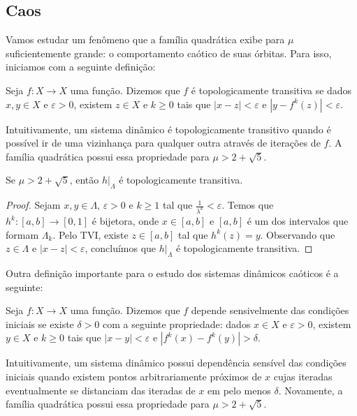 \subsection{Caos}

Vamos estudar um fenômeno que a família quadrática exibe para $\mu$ suficientemente grande: o comportamento caótico de suas órbitas.
Para isso, iniciamos com a seguinte definição:

\begin{definition}
Seja $f: X \to X$ uma função. Dizemos que $f$ é topologicamente transitiva se dados $x, y \in X$ e $\varepsilon > 0$,  existem $z \in X$ e $k \geq 0$ tais que $|x - z| < \varepsilon$ e $|y - f^k(z)| < \varepsilon$.
\end{definition} 

Intuitivamente, um sistema dinâmico é topologicamente transitivo quando é possível ir de uma vizinhança para qualquer outra através de iterações de $f$. A família quadrática possui essa propriedade para $\mu > 2 + \sqrt{5}$.

\begin{proposition}
Se $\mu > 2 + \sqrt{5}$, então $h|_\Lambda$ é topologicamente transitiva.
\end{proposition}

\begin{proof}
Sejam $x, y \in \Lambda$, $\varepsilon > 0$ e $k \geq 1$ tal que $\frac{1}{\lambda^k} < \varepsilon$.
Temos que $h^k: [a, b] \to [0, 1]$ é bijetora, onde $x \in [a, b]$ e $[a, b]$ é um dos intervalos que formam $\Lambda_k$. Pelo TVI, existe $z \in [a, b]$ tal que $h^k(z) = y$. Observando que $z \in \Lambda$ e $|x - z| < \varepsilon$, concluímos que $h|_\Lambda$ é topologicamente transitiva.
\end{proof}

Outra definição importante para o estudo dos sistemas dinâmicos caóticos é a seguinte:

\begin{definition}
Seja $f: X \to X$ uma função. Dizemos que $f$ depende sensivelmente das condições iniciais se existe $\delta > 0$ com a seguinte propriedade: dados $x \in X$ e $\varepsilon > 0$, existem $y \in X$ e $k \geq 0$ tais que $|x - y| < \varepsilon$ e $|f^k(x) - f^k(y)| > \delta$.
\end{definition}

Intuitivamente, um sistema dinâmico possui dependência sensível das condições iniciais quando existem pontos arbitrariamente próximos de $x$ cujas iteradas eventualmente se distanciam das iteradas de $x$ em pelo menos $\delta$.
Novamente, a família quadrática possui essa propriedade para $\mu > 2 + \sqrt{5}$.

